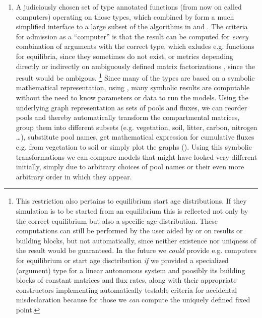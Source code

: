 \begin{enumerate}
    \item
      A judiciously chosen set of type annotated functions (from now on called computers) operating on those types,  which combined
      by \ComputabilityGraphs{} form a much simplified 
      interface to a large subset of the algorithms in \CompartmentalSystems{} and \LAPM{}.
      The criteria for admission as a ``computer'' is that the result can be computed for \emph{every} combination of arguments with the correct type, which exludes e.g. functions for equilibria, 
      since they sometimes do not exist, or metrics depending directly or indirectly on ambiguously defined matrix factorizations , since the result would be ambigous.  
      \footnote{
      This restriction also pertains to equilibrium start age distributions. 
      If they simulation is to be started from an equilibrium this is reflected not only by the correct equilibrium
      but also a specific age distribution.  
      These computations can still be performed by the user aided by  \LAPM{} or \CompartmentalSystems{} on results or building blocks, but not automatically, since neither existence nor uniqness of the result would be guaranteed. 
      In the future we \emph{could} provide e.g. computers for equilibrium or start age disctribution 
      \emph{if} we provided 
      a specialized (argument) type for a linear autonomous system 
      and poosibly its building blocks of constant matrices and flux rates, 
      along with their appropriate constructors implementing
      automatically testable criteria for accidental misdeclaration because 
      for those we \emph{can} compute the uniquely defined fixed point.
      }
      Since many of the types are based on a symbolic
      mathematical representation, using \sympy{}, many symbolic results are computable 
      without the need to know parameters or data to run the
      models.  Using the underlying graph representation as sets
      of pools and fluxes, we can reorder pools and thereby
      automatically transform the compartmental matrices, group
      them into different subsets (e.g. vegetation, soil, litter,
      carbon, nitrogen \dots ), substitute pool names, get
      mathematical expression for cumulative fluxes e.g. from
      vegetation to soil or simply plot the graphs ().
      Using this symbolic transformations we can compare models that might
      have looked very different initially, simply due to
      arbitrary choices of pool names or their even more arbitrary
      order in which they appear. 

\end{enumerate}
